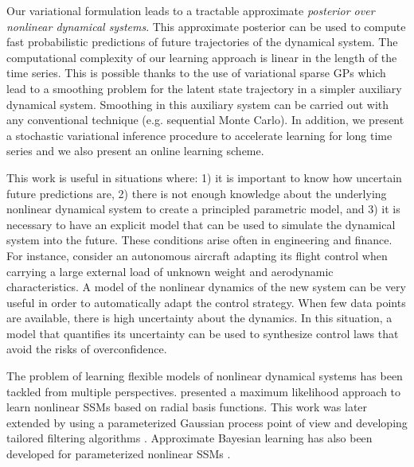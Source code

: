 \documentclass{article} %
\begin{document}
Our variational formulation leads to a tractable approximate \emph{posterior over nonlinear dynamical systems}. This approximate posterior can be used to compute fast probabilistic predictions of future trajectories of the dynamical system. 
The computational complexity of our learning approach is linear in the length of the time series. This is possible thanks to the use of variational sparse GPs \citep{Titsias2009} which lead to a smoothing problem for the latent state trajectory in a simpler auxiliary dynamical system. Smoothing in this auxiliary system can be carried out with any conventional technique (e.g. sequential Monte Carlo). In addition, we present a stochastic variational inference procedure \citep{hoffman2013stochastic} to accelerate learning for long time series and we also present an online learning scheme.

This work is useful in situations where: 1) it is important to know how uncertain future predictions are, 2) there is not enough knowledge about the underlying nonlinear dynamical system to create a principled parametric model, and 3) it is necessary to have an explicit model that can be used to simulate the dynamical system into the future. These conditions arise often in engineering and finance. For instance, consider an autonomous aircraft adapting its flight control when carrying a large external load of unknown weight and aerodynamic characteristics. A model of the nonlinear dynamics of the new system can be very useful in order to automatically adapt the control strategy. When few data points are available, there is high uncertainty about the dynamics. In this situation, a model that quantifies its uncertainty can be used to synthesize control laws that avoid the risks of overconfidence. %



The problem of learning flexible models of nonlinear dynamical systems has been tackled from multiple perspectives. \citet{Ghahramani1999} presented a maximum likelihood approach to learn nonlinear SSMs based on radial basis functions. This work was later extended by using a parameterized Gaussian process point of view and developing tailored filtering algorithms \citep{DeisenrothMohamed2012,DeisenrothTurner2011,TurDeiRas10}. Approximate Bayesian learning has also been developed for parameterized nonlinear SSMs \citep{Daunizeau2009,ValKar02}.
\end{document}
